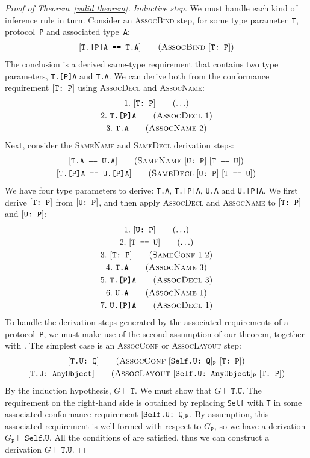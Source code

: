 \documentclass[../generics]{subfiles}
\begin{document}
\begin{proof}[Proof of Theorem~\ref*{valid theorem}]
\emph{Inductive step.} We must handle each kind of inference rule in turn. Consider an \textsc{AssocBind} step, for some type parameter~\texttt{T}, protocol~\texttt{P} and associated type~\texttt{A}:
\begin{gather*}
\AssocBindStepDef
\end{gather*}
The conclusion is a derived same-type requirement that contains two type parameters, \texttt{T.[P]A} and \texttt{T.A}. We can derive both from the conformance requirement $[\texttt{T:~P}]$ using \textsc{AssocDecl} and \textsc{AssocName}:
\begin{gather*}
\AnyStep{\ConfReq{T}{P}}{1}\\
\AssocDeclStep{1}{T.[P]A}{2}\\
\AssocNameStep{2}{T.A}{3}
\end{gather*}
Next, consider the \textsc{SameName} and \textsc{SameDecl} derivation steps:
\begin{gather*}
\SameNameStepDef\\
\SameDeclStepDef
\end{gather*}
We have four type parameters to derive: \texttt{T.A}, \texttt{T.[P]A}, \texttt{U.A} and \texttt{U.[P]A}. We first derive $[\texttt{T:~P}]$ from $[\texttt{U:~P}]$, and then apply \textsc{AssocDecl} and \textsc{AssocName} to $[\texttt{T:~P}]$ and $[\texttt{U:~P}]$:
\begin{gather*}
\AnyStep{\ConfReq{U}{P}}{1}\\
\AnyStep{\SameReq{T}{U}}{2}\\
\SameConfStep{1}{2}{T}{P}{3}\\
\AssocNameStep{3}{T.A}{4}\\
\AssocDeclStep{3}{T.[P]A}{5}\\
\AssocNameStep{1}{U.A}{6}\\
\AssocDeclStep{1}{U.[P]A}{7}
\end{gather*}
To handle the derivation steps generated by the associated requirements of a protocol~\texttt{P}, we must make use of the second assumption of our theorem, together with . The simplest case is an \textsc{AssocConf} or \textsc{AssocLayout} step:
\begin{gather*}
\AssocConfStepDef\\
\AssocLayoutStepDef
\end{gather*}
By the induction hypothesis, $G\vdash\texttt{T}$. We must show that $G\vdash\texttt{T.U}$. The requirement on the right-hand side is obtained by replacing \texttt{Self} with \texttt{T} in some associated conformance requirement $[\texttt{Self.U:~Q}]_\texttt{P}$. By assumption, this associated requirement is well-formed with respect to $G_\texttt{P}$, so we have a derivation $G_\texttt{P}\vdash\texttt{Self.U}$. All the conditions of  are satisfied, thus we can construct a derivation $G\vdash\texttt{T.U}$.


\end{proof}
\end{document}
